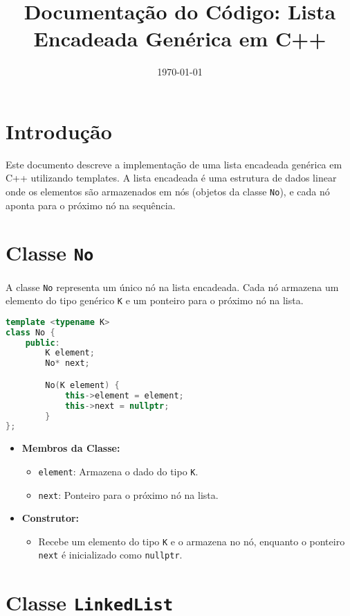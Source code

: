 \documentclass[a4paper,12pt]{article}
\title{Documentação do Código: Lista Encadeada Genérica em C++}
\date{\today}
\begin{document}
\maketitle

\section{Introdução}

Este documento descreve a implementação de uma lista encadeada genérica em C++ utilizando templates. A lista encadeada é uma estrutura de dados linear onde os elementos são armazenados em nós (objetos da classe \texttt{No}), e cada nó aponta para o próximo nó na sequência.

\section{Classe \texttt{No}}

A classe \texttt{No} representa um único nó na lista encadeada. Cada nó armazena um elemento do tipo genérico \texttt{K} e um ponteiro para o próximo nó na lista.

\begin{lstlisting}[language=C++, caption=Classe No]
template <typename K>
class No {
    public:
        K element;
        No* next;

        No(K element) {
            this->element = element;
            this->next = nullptr;
        }
};
\end{lstlisting}

\begin{itemize}
    \item \textbf{Membros da Classe:}
    \begin{itemize}
        \item \texttt{element}: Armazena o dado do tipo \texttt{K}.
        \item \texttt{next}: Ponteiro para o próximo nó na lista.
    \end{itemize}
    \item \textbf{Construtor:}
    \begin{itemize}
        \item Recebe um elemento do tipo \texttt{K} e o armazena no nó, enquanto o ponteiro \texttt{next} é inicializado como \texttt{nullptr}.
    \end{itemize}
\end{itemize}

\section{Classe \texttt{LinkedList}}
\end{document}
